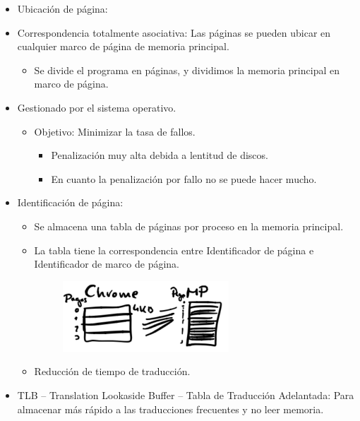 \documentclass[12pt, twoside, openright]{report} %
\begin{document}
  \begin{itemize}
  \item
    Ubicación de página:
  \item
    Correspondencia totalmente asociativa: Las páginas se pueden ubicar
    en cualquier marco de página de memoria principal.

    \begin{itemize}
    
    \item
      Se divide el programa en páginas, y dividimos la memoria principal
      en marco de página.
    \end{itemize}
  \item
    Gestionado por el sistema operativo.

    \begin{itemize}
    
    \item
      Objetivo: Minimizar la tasa de fallos.

      \begin{itemize}
      
      \item
        Penalización muy alta debida a lentitud de discos.
      \item
        En cuanto la penalización por fallo no se puede hacer mucho.
      \end{itemize}
    \end{itemize}
  \item
    Identificación de página:

    \begin{itemize}
    \item
      Se almacena una tabla de páginas por proceso en la memoria
      principal.
    \item
      La tabla tiene la correspondencia entre Identificador de página e
      Identificador de marco de página.

      \begin{figure}[H]
        {\includegraphics[scale=.65]{Untitled 29.png}}
      \end{figure}
    \item
      Reducción de tiempo de traducción.
    \end{itemize}
  \item
    TLB -- Translation Lookaside Buffer -- Tabla de Traducción
    Adelantada: Para almacenar más rápido a las traducciones frecuentes y
    no leer memoria.


\end{itemize}
\end{document}
